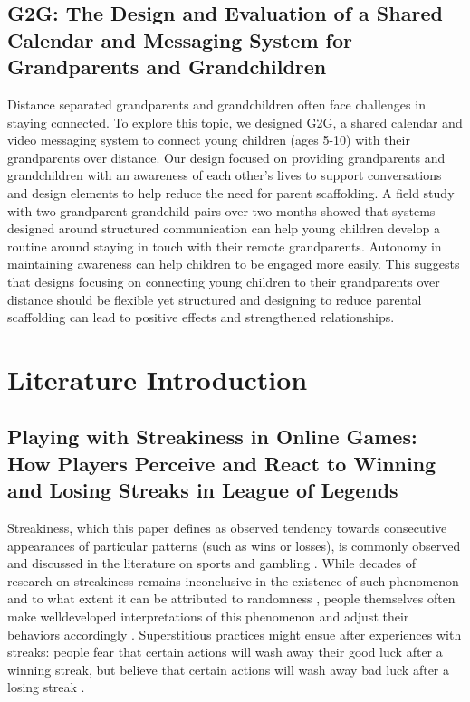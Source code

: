 \subsection{G2G: The Design and Evaluation of a Shared Calendar and
Messaging System for Grandparents and Grandchildren }

Distance separated grandparents and grandchildren often
face challenges in staying connected. To explore this topic,
we designed G2G, a shared calendar and video messaging
system to connect young children (ages 5-10) with their
grandparents over distance. Our design focused on
providing grandparents and grandchildren with an
awareness of each other’s lives to support conversations
and design elements to help reduce the need for parent
scaffolding. A field study with two grandparent-grandchild
pairs over two months showed that systems designed
around structured communication can help young children
develop a routine around staying in touch with their remote
grandparents. Autonomy in maintaining awareness can help
children to be engaged more easily. This suggests that
designs focusing on connecting young children to their
grandparents over distance should be flexible yet structured
and designing to reduce parental scaffolding can lead to
positive effects and strengthened relationships.

\section{Literature Introduction}

\subsection{Playing with Streakiness in Online Games: How Players
Perceive and React to Winning and Losing Streaks in
League of Legends }

Streakiness, which this paper defines as observed tendency
towards consecutive appearances of particular patterns
(such as wins or losses), is commonly observed and
discussed in the literature on sports  and gambling .
While decades of research on streakiness remains
inconclusive in the existence of such phenomenon and to 
what extent it can be attributed to randomness
, people themselves often make welldeveloped
interpretations of this phenomenon and adjust
their behaviors accordingly . Superstitious practices
might ensue after experiences with streaks: people fear that
certain actions will wash away their good luck after a
winning streak, but believe that certain actions will wash
away bad luck after a losing streak .


